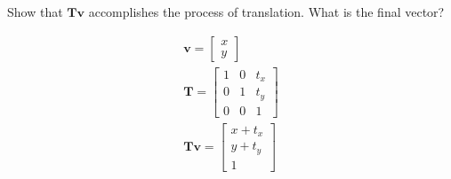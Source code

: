 Show that $\boldsymbol{Tv}$ accomplishes the process of translation. What is the final vector?

\begin{solution}
\begin{align*}
    \boldsymbol{v} = \begin{bmatrix}
        x \\ y
    \end{bmatrix} \\
    \boldsymbol{T} = \begin{bmatrix}
        1 & 0 & t_x \\
        0 & 1 & t_y \\
        0 & 0 & 1
    \end{bmatrix} \\
    \boldsymbol{Tv} = \begin{bmatrix}
        x + t_x \\ y + t_y \\ 1 
    \end{bmatrix}
\end{align*}
\end{solution}